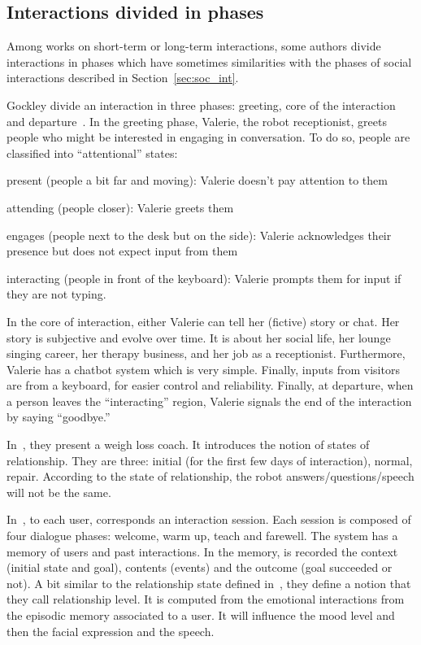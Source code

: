 \documentclass[a4paper,11pt,twoside]{StyleThese}
\begin{document}
\subsection{Interactions divided in phases}
Among works on short-term or long-term interactions, some authors divide interactions in phases which have sometimes similarities with the phases of social interactions described in Section~\ref{sec:soc_int}.

Gockley \etal divide an interaction in three phases: greeting, core of the interaction and departure~\cite{gockley_2005_designing}. In the greeting phase, Valerie, the robot receptionist, greets people who might be interested in engaging in conversation. To do so, people are classified into ``attentional'' states:
\begin{enumerate*}
	\item present (people a bit far and moving): Valerie doesn’t pay attention to them
	\item attending (people closer): Valerie greets them
	\item engages (people next to the desk but on the side): Valerie acknowledges their presence but does not expect input from them
	\item interacting (people in front of the keyboard): Valerie prompts them for input if they are not typing.
\end{enumerate*}
In the core of interaction, either Valerie can tell her (fictive) story or chat. Her story is subjective and evolve over time. It is about her social life, her lounge singing career, her therapy business, and her job as a receptionist. Furthermore, Valerie has a chatbot system which is very simple. Finally, inputs from visitors are from a keyboard, for easier control and reliability. Finally, at departure, when a person leaves the ``interacting'' region, Valerie signals the end of the interaction by saying ``goodbye.'' 

In~\cite{kidd_2008_robots}, they present a weigh loss coach. It introduces the notion of states of relationship. They are three: initial (for the first few days of interaction), normal, repair. According to the state of relationship, the robot answers/questions/speech will not be the same.

In~\cite{kasap_2012_building}, to each user, corresponds an interaction session. Each session is composed of four dialogue phases: welcome, warm up, teach and farewell. The system has a memory of users and past interactions. In the memory, is recorded the context (initial state and goal), contents (events) and the outcome (goal succeeded or not).  A bit similar to the relationship state defined in~\cite{kidd_2008_robots}, they define a notion that they call relationship level. It is computed from the emotional interactions from the episodic memory associated to a user. It will influence the mood level and then the facial expression and the speech.
\end{document}
